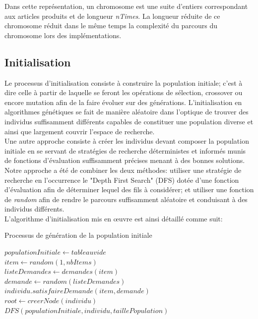 \documentclass[12pt,a4paper]{article}
\begin{document}
	Dans cette représentation, un chromosome est une suite d'entiers correspondant aux articles produits et de longueur \emph{nTimes}. La longueur réduite de ce chromosome réduit dans le même temps la complexité du parcours du chromosome lors des implémentations.
	\subsection{Initialisation}
	Le processus d'initialisation consiste à construire la population initiale; c'est à dire celle à partir de laquelle se feront les opérations de sélection, crossover ou encore mutation afin de la faire évoluer sur des générations. L'initialisation en algorithmes génétiques se fait de manière aléatoire dans l'optique de trouver des individus suffisamment différents capables de constituer une population diverse et ainsi que largement couvrir l'espace de recherche. \\
	\hspace*{.5cm} Une autre approche consiste à créer les individus devant composer la population initiale en se servant de stratégies de recherche déterministes et informés munis de fonctions d'évaluation suffisamment précises menant à des bonnes solutions. Notre approche a été de combiner les deux méthodes: utiliser une stratégie de recherche en l’occurrence le "Depth First Search" (DFS) dotée d'une fonction d'évaluation afin de déterminer lequel des fils à considérer; et utiliser une fonction de \emph{random} afin de rendre le parcours suffisamment aléatoire et conduisant à des individus différents. \\
	\hspace*{.5cm} L'algorithme d'initialisation mis en œuvre est ainsi détaillé comme suit: \\
	
	\begin{algorithm}[H]
 		\caption{Processus de génération de la population initiale}
 		\BlankLine
 		\BlankLine
 	    $populationInitiale \gets tableau vide$  \\
 	    \BlankLine
 	    $item \gets random(1, nbItems)$ \\
 	    \BlankLine
 	    $listeDemandes \gets demandes(item)$ \\
 	    \BlankLine
 	    $demande \gets random(listeDemandes)$ \\
 	    \BlankLine
 	    $individu.satisfaireDemande(item, demande)$\\
 	    \BlankLine
 	    $root \gets creerNode(individu)$ \\
 	    \BlankLine
 	    $DFS(populationInitiale, individu, taillePopulation)$ \\
 	    \BlankLine
	\end{algorithm}
	
\end{document}
